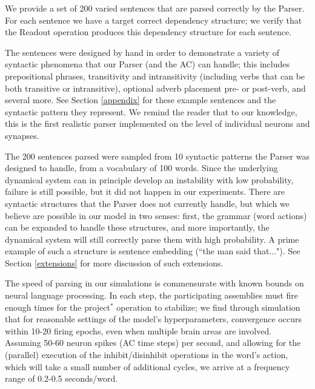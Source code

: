 \documentclass[11pt,a4paper]{article}
\begin{document}
We provide a set of 200 varied sentences that are parsed correctly by the Parser. For each sentence we have a target correct dependency structure; we verify that the Readout operation produces this dependency structure for each sentence. 

The sentences were designed by hand in order to demonstrate a variety of syntactic phenomena that our Parser (and the AC) can handle; this includes prepositional phrases, transitivity and intransitivity (including verbs that can be both transitive or intransitive), optional adverb placement pre- or post-verb, and several more. See Section \ref{appendix} for these example sentences and the syntactic pattern they represent. We remind the reader that to our knowledge, this is the first realistic parser implemented on the level of individual neurons and synapses.

The 200 sentences parsed were sampled from 10 syntactic patterns the Parser was designed to handle, from a vocabulary of 100 words.  Since the underlying dynamical system can in principle develop an instability with low probability, failure is still possible, but it did not happen in our experiments. There are syntactic structures that the Parser does not currently handle, but which we believe are possible in our model in two senses: first, the grammar (word actions) can be expanded to handle these structures, and more importantly, the dynamical system will still correctly parse them with high probability. A prime example of such a structure is sentence embedding (``the man said that..."). See Section \ref{extensions} for more discussion of such extensions. 

The speed of parsing in our simulations is commensurate with known bounds on neural language processing. In each step, the participating assemblies must fire enough times for the project$^*$ operation to stabilize; we find through simulation that for reasonable settings of the model’s hyperparameters, convergence occurs within 10-20 firing epochs, even when multiple brain areas are involved. Assuming 50-60 neuron spikes (AC time steps) per second, and allowing for the (parallel) execution of the inhibit/disinhibit operations in the word's action, which will take a small number of additional cycles, we arrive at a frequency range of 0.2-0.5 seconds/word.

\end{document}
